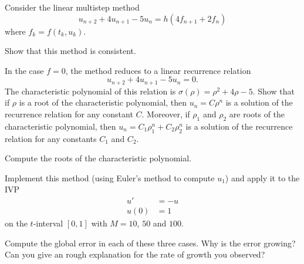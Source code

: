 \documentclass[minion]{homework}
\begin{document}
\begin{problems}
\problem Consider the linear multistep method
\[
u_{n+2} +4 u_{n+1} -5u_{n} = h(4f_{n+1}+2f_n)
\]
where $f_k=f(t_k,u_k)$. 
\begin{subproblems}
\item Show that this method is consistent.
\item In the case $f=0$, the method reduces to
a linear recurrence relation
\[
u_{n+2} +4 u_{n+1} -5u_{n} = 0.
\]
The characteristic polynomial of this relation is
$\sigma(\rho) = \rho^2+4\rho -5$.  Show that if
$\rho$ is a root of the characteristic polynomial, then
$u_n = C\rho^n$ is a solution of the recurrence relation
for any constant $C$. Moreover, if $\rho_1$ and $\rho_2$
are roots of the characteristic polynomial, then
$u_n=C_1\rho_1^n + C_2\rho_2^n$ is a solution of the
recurrence relation for any constants $C_1$ and $C_2$.
\item Compute the roots of the characteristic polynomial.
\item Implement this method (using Euler's method 
to compute $u_1$) and apply it to the IVP
\begin{align*}
u'&=-u\\
u(0)&=1
\end{align*}
on the $t$-interval $[0,1]$ with $M=10$, $50$ and $100$.
\item Compute the global error in each of these three cases.
Why is the error growing?  Can you give an rough explanation
for the rate of growth you observed?
\end{subproblems}

\end{problems}
\end{document}
